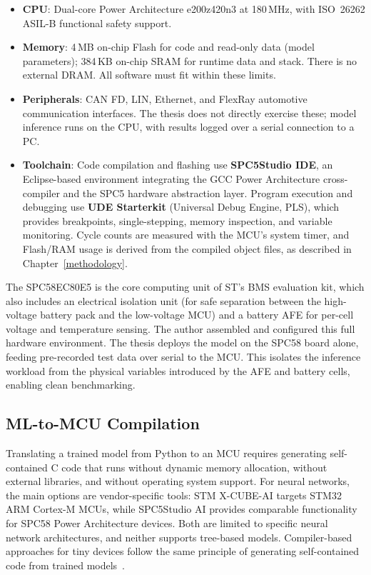 \begin{itemize}
    \item \textbf{CPU}: Dual-core Power Architecture e200z420n3 at 180\,MHz, with ISO~26262 ASIL-B functional safety support.
    \item \textbf{Memory}: 4\,MB on-chip Flash for code and read-only data (model parameters); 384\,KB on-chip SRAM for runtime data and stack. There is no external DRAM. All software must fit within these limits.
    \item \textbf{Peripherals}: CAN FD, LIN, Ethernet, and FlexRay automotive communication interfaces. The thesis does not directly exercise these; model inference runs on the CPU, with results logged over a serial connection to a PC.
    \item \textbf{Toolchain}: Code compilation and flashing use \textbf{SPC5Studio IDE}, an Eclipse-based environment integrating the GCC Power Architecture cross-compiler and the SPC5 hardware abstraction layer. Program execution and debugging use \textbf{UDE Starterkit} (Universal Debug Engine, PLS), which provides breakpoints, single-stepping, memory inspection, and variable monitoring. Cycle counts are measured with the MCU's system timer, and Flash/RAM usage is derived from the compiled object files, as described in Chapter~\ref{methodology}.
\end{itemize}

The SPC58EC80E5 is the core computing unit of ST's BMS evaluation kit, which also includes an electrical isolation unit (for safe separation between the high-voltage battery pack and the low-voltage MCU) and a battery \gls{AFE} for per-cell voltage and temperature sensing. The author assembled and configured this full hardware environment. The thesis deploys the model on the SPC58 board alone, feeding pre-recorded test data over serial to the MCU. This isolates the inference workload from the physical variables introduced by the AFE and battery cells, enabling clean benchmarking.

\subsection{ML-to-MCU Compilation}

Translating a trained model from Python to an MCU requires generating self-contained C code that runs without dynamic memory allocation, without external libraries, and without operating system support. For neural networks, the main options are vendor-specific tools: STM X-CUBE-AI targets STM32 ARM Cortex-M MCUs, while SPC5Studio AI provides comparable functionality for SPC58 Power Architecture devices. Both are limited to specific neural network architectures, and neither supports tree-based models. Compiler-based approaches for tiny devices follow the same principle of generating self-contained code from trained models~\autocite{gopinath2019}.

